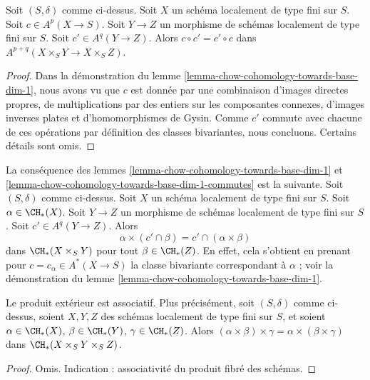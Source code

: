 \begin{lemma}
\label{lemma-chow-cohomology-towards-base-dim-1-commutes}
Soit $(S, \delta)$ comme ci-dessus. Soit $X$ un schéma localement de type fini
sur $S$. Soit $c \in A^p(X \to S)$. Soit $Y \to Z$ un morphisme de schémas
localement de type fini sur $S$. Soit $c' \in A^q(Y \to Z)$. Alors
$c \circ c' = c' \circ c$ dans $A^{p + q}(X \times_S Y \to X \times_S Z)$.
\end{lemma}

\begin{proof}
Dans la démonstration du lemme \ref{lemma-chow-cohomology-towards-base-dim-1},
nous avons vu que $c$ est donnée par une combinaison d'images
directes propres, de multiplications par des entiers sur les composantes
connexes, d'images inverses plates et d'homomorphismes de Gysin. Comme $c'$ commute avec chacune de
ces opérations par définition des classes bivariantes, nous concluons.
Certains détails sont omis.
\end{proof}

\begin{remark}
\label{remark-commuting-exterior-dim-1}
La conséquence des lemmes \ref{lemma-chow-cohomology-towards-base-dim-1}
et \ref{lemma-chow-cohomology-towards-base-dim-1-commutes} est la suivante.
Soit $(S, \delta)$ comme ci-dessus. Soit $X$ un schéma localement de type fini
sur $S$.
Soit $\alpha \in \CH_*(X)$. Soit $Y \to Z$ un morphisme de schémas
localement de type fini sur $S$. Soit $c' \in A^q(Y \to Z)$. Alors
$$
\alpha \times (c' \cap \beta) = c' \cap (\alpha \times \beta)
$$
dans $\CH_*(X \times_S Y)$ pour tout $\beta \in \CH_*(Z)$. En effet, cela
s'obtient en prenant pour $c = c_\alpha \in A^*(X \to S)$ la classe bivariante
correspondant à $\alpha$ ; voir la démonstration du
lemme \ref{lemma-chow-cohomology-towards-base-dim-1}.
\end{remark}

\begin{lemma}
\label{lemma-exterior-product-associative-dim-1}
Le produit extérieur est associatif. Plus précisément, soit $(S, \delta)$
comme ci-dessus, soient $X, Y, Z$ des schémas localement de type fini sur $S$, et soient
$\alpha \in \CH_*(X)$, $\beta \in \CH_*(Y)$, $\gamma \in \CH_*(Z)$.
Alors $(\alpha \times \beta) \times \gamma =
\alpha \times (\beta \times \gamma)$ dans $\CH_*(X \times_S Y \times_S Z)$.
\end{lemma}

\begin{proof}
Omis. Indication : associativité du produit fibré des schémas.
\end{proof}















